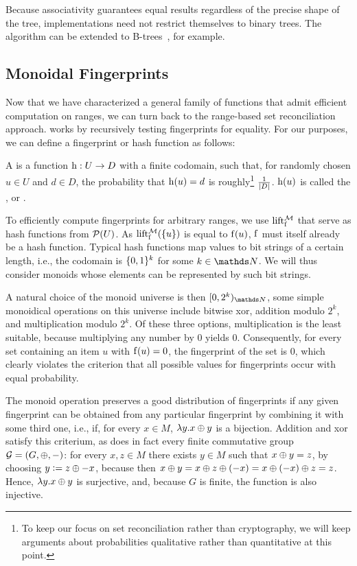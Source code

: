 \documentclass[conference]{IEEEtran}
\begin{document}
Because associativity guarantees equal results regardless of the precise shape of the tree, implementations need not restrict themselves to binary trees. The algorithm can be extended to B-trees~\cite{bayer2002organization}, for example.

\subsection{Monoidal Fingerprints}

Now that we have characterized a general family of functions that admit efficient computation on ranges, we can turn back to the range-based set reconciliation approach.  works by recursively testing fingerprints for equality. For our purposes,
we can define a fingerprint or hash function as follows:

\begin{definition}
A  is a function ${\operatorname{h}}: {U} \rightarrow {D}$ with a finite codomain, such that, for randomly chosen $u \in U$ and $d \in D$, the probability that $\operatorname{h}(u) = d$ is roughly\footnote{To keep our focus on set reconciliation rather than cryptography, we will keep arguments about probabilities qualitative rather than quantitative at this point.} $\frac{1}{|{D}|}$. $\operatorname{h}(u)$ is called the ,  or .
\end{definition}

To efficiently compute fingerprints for arbitrary ranges, we use \somewhatmorphisms{} $\operatorname{lift_{\operatorname{f}}^{\mathcal{M}}}$ that serve as hash functions from $\mathcal{P}({U})$. As $\operatorname{lift_{\operatorname{f}}^{\mathcal{M}}}(\{u\})$ is equal to $\operatorname{f}(u)$, $\operatorname{f}$ must itself already be a hash function. Typical hash functions map values to bit strings of a certain length, i.e., the codomain is $\{0, 1\}^k$ for some $k \in \N$. We will thus consider monoids whose elements can be represented by such bit strings.

A natural choice of the monoid universe is then $\range{0}{2^k}{\N}$, some simple monoidical operations on this universe include bitwise xor, addition modulo $2^k$, and multiplication modulo $2^k$. Of these three options, multiplication is the least suitable, because multiplying any number by $0$ yields $0$. Consequently, for every set containing an item $u$ with $\operatorname{f}(u) = 0$, the fingerprint of the set is $0$, which clearly violates the criterion that all possible values for fingerprints occur with equal probability.

The monoid operation preserves a good distribution of fingerprints if any given fingerprint can be obtained from any particular fingerprint by combining it with some third one, i.e., if, for every $x \in M$, $\lambda y.x \oplus y$ is a bijection. Addition and xor satisfy this criterium, as does in fact every finite commutative group $\mathcal{G} = (G, \oplus, -)$: for every $x, z \in M$ there exists $y \in M$ such that $x \oplus y = z$, by choosing $y \vcentcolon= z \oplus -x$, because then $x \oplus y = x \oplus z \oplus (-x) = x \oplus (-x) \oplus z = z$. Hence, $\lambda y.x \oplus y$ is surjective, and, because $G$ is finite, the function is also injective.
\end{document}
